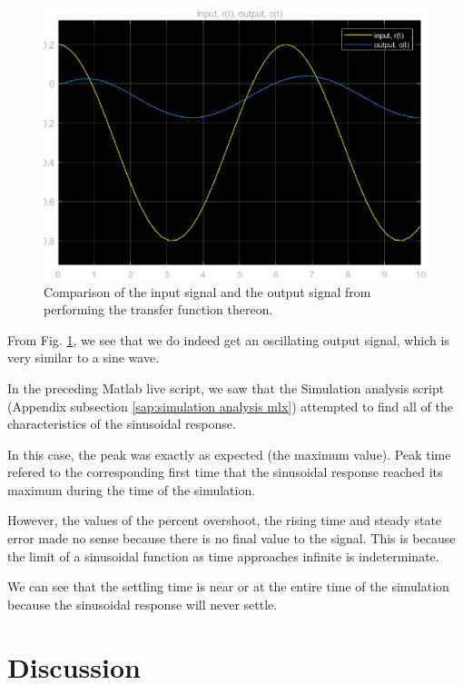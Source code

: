 \documentclass[12pt]{article}
\begin{document}
\begin{figure}[h]
    \centering
    \includegraphics[width=\linewidth]{part02_scope.eps}
    \caption{Comparison of the input signal and the output signal from performing the transfer function thereon.}
    \label{fig:part02_scope}
\end{figure}

From Fig. \ref{fig:part02_scope}, we see that we do indeed get an oscillating output signal, which is very similar to a sine wave.



In the preceding Matlab live script,
we saw that
the Simulation analysis script (Appendix subsection \ref{sap:simulation analysis mlx})
attempted to find all of the characteristics of the sinusoidal response.

In this case, the peak was exactly as expected (the maximum value).
Peak time refered to the corresponding first time that the sinusoidal response reached its maximum
during the time of the simulation.

However, the values of the percent overshoot, the rising time and steady state error made no sense because there is no final value to the signal.
This is because the limit of a sinusoidal function as time approaches infinite is indeterminate.

We can see that the settling time is near or at the entire time of the simulation because the sinusoidal response will never settle.

\section{Discussion}
\end{document}
